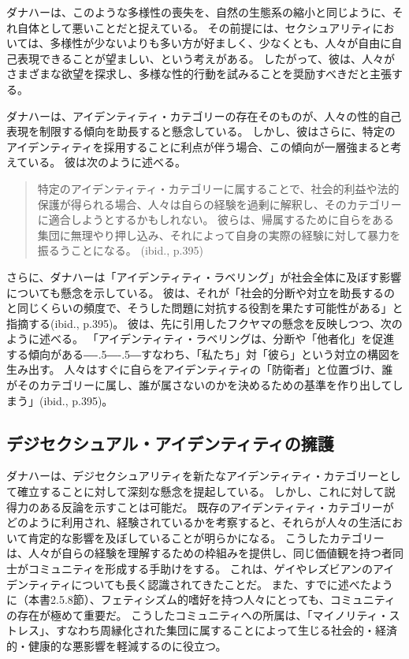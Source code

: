 \documentclass[paper=a4,book,openany]{jlreq}
\def\DDASH{―\kern-.5\zw―\kern-.5\zw―}
\begin{document}
ダナハーは、このような多様性の喪失を、自然の生態系の縮小と同じように、それ自体として悪いことだと捉えている。
その前提には、セクシュアリティにおいては、多様性が少ないよりも多い方が好ましく、少なくとも、人々が自由に自己表現できることが望ましい、という考えがある。
したがって、彼は、人々がさまざまな欲望を探求し、多様な性的行動を試みることを奨励すべきだと主張する。

ダナハーは、アイデンティティ・カテゴリーの存在そのものが、人々の性的自己表現を制限する傾向を助長すると懸念している。
しかし、彼はさらに、特定のアイデンティティを採用することに利点が伴う場合、この傾向が一層強まると考えている。
彼は次のように述べる。

\begin{quote}
特定のアイデンティティ・カテゴリーに属することで、社会的利益や法的保護が得られる場合、人々は自らの経験を過剰に解釈し、そのカテゴリーに適合しようとするかもしれない。
彼らは、帰属するために自らをある集団に無理やり押し込み、それによって自身の実際の経験に対して暴力を振るうことになる。
(ibid., p.395)

\end{quote}

さらに、ダナハーは「アイデンティティ・ラベリング」が社会全体に及ぼす影響についても懸念を示している。
彼は、それが「社会的分断や対立を助長するのと同じくらいの頻度で、そうした問題に対抗する役割を果たす可能性がある」と指摘する(ibid., p.395)。
彼は、先に引用したフクヤマの懸念を反映しつつ、次のように述べる。
「アイデンティティ・ラベリングは、分断や「他者化」を促進する傾向がある{\DDASH}すなわち、「私たち」対「彼ら」という対立の構図を生み出す。
人々はすぐに自らをアイデンティティの「防衛者」と位置づけ、誰がそのカテゴリーに属し、誰が属さないのかを決めるための基準を作り出してしまう」(ibid., p.395)。

\subsection{デジセクシュアル・アイデンティティの擁護}

ダナハーは、デジセクシュアリティを新たなアイデンティティ・カテゴリーとして確立することに対して深刻な懸念を提起している。
しかし、これに対して説得力のある反論を示すことは可能だ。
既存のアイデンティティ・カテゴリーがどのように利用され、経験されているかを考察すると、それらが人々の生活において肯定的な影響を及ぼしていることが明らかになる。
こうしたカテゴリーは、人々が自らの経験を理解するための枠組みを提供し、同じ価値観を持つ者同士がコミュニティを形成する手助けをする。
これは、ゲイやレズビアンのアイデンティティについても長く認識されてきたことだ。
また、すでに述べたように（本書2.5.8節）、フェティシズム的嗜好を持つ人々にとっても、コミュニティの存在が極めて重要だ。
こうしたコミュニティへの所属は、「マイノリティ・ストレス」、すなわち周縁化された集団に属することによって生じる社会的・経済的・健康的な悪影響を軽減するのに役立つ\citep{salfas19:_what_is_role_commun}。
\end{document}
